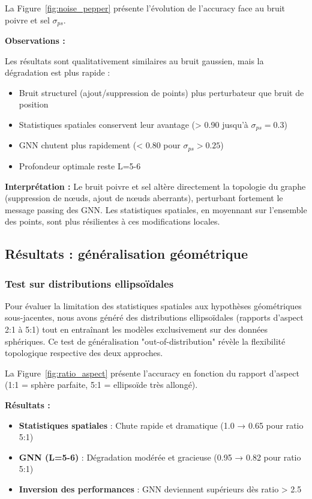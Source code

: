 La Figure~\ref{fig:noise_pepper} présente l'évolution de l'accuracy face au bruit poivre et sel $\sigma_{ps}$.

\textbf{Observations :}

Les résultats sont qualitativement similaires au bruit gaussien, mais la dégradation est plus rapide :
\begin{itemize}
    \item Bruit structurel (ajout/suppression de points) plus perturbateur que bruit de position
    \item Statistiques spatiales conservent leur avantage (> 0.90 jusqu'à $\sigma_{ps}=0.3$)
    \item GNN chutent plus rapidement (< 0.80 pour $\sigma_{ps} > 0.25$)
    \item Profondeur optimale reste L=5-6
\end{itemize}

\textbf{Interprétation :} Le bruit poivre et sel altère directement la topologie du graphe (suppression de nœuds, ajout de nœuds aberrants), perturbant fortement le message passing des GNN. Les statistiques spatiales, en moyennant sur l'ensemble des points, sont plus résilientes à ces modifications locales.

\subsection{Résultats : généralisation géométrique}

\subsubsection{Test sur distributions ellipsoïdales}

Pour évaluer la limitation des statistiques spatiales aux hypothèses géométriques sous-jacentes, nous avons généré des distributions ellipsoïdales (rapports d'aspect 2:1 à 5:1) tout en entraînant les modèles exclusivement sur des données sphériques. Ce test de généralisation "out-of-distribution" révèle la flexibilité topologique respective des deux approches.

La Figure~\ref{fig:ratio_aspect} présente l'accuracy en fonction du rapport d'aspect (1:1 = sphère parfaite, 5:1 = ellipsoïde très allongé).

\textbf{Résultats :}
\begin{itemize}
    \item \textbf{Statistiques spatiales} : Chute rapide et dramatique (1.0 → 0.65 pour ratio 5:1)
    \item \textbf{GNN (L=5-6)} : Dégradation modérée et gracieuse (0.95 → 0.82 pour ratio 5:1)
    \item \textbf{Inversion des performances} : GNN deviennent supérieurs dès ratio > 2.5
\end{itemize}

